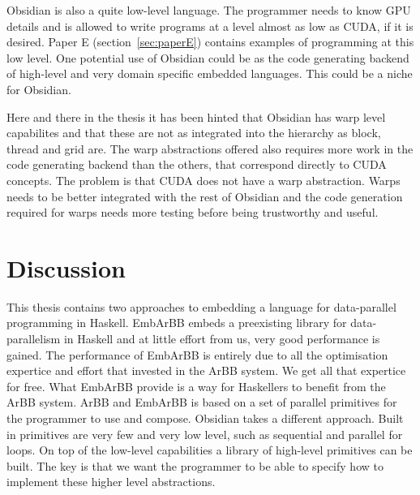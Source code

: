 \documentclass[a4paper]{book}
\begin{document}
Obsidian is also a quite low-level language. The programmer needs to know GPU details 
and is allowed to write programs at a level almost as low as CUDA, if it is desired. 
Paper E (section~\ref{sec:paperE}) contains examples of programming at this low level. 
One potential use of Obsidian could be as the code generating backend of high-level 
and very domain specific embedded languages. This could be a niche for Obsidian.  

Here and there in the thesis it has been hinted that Obsidian has warp level 
capabilites and that these are not as integrated into the hierarchy as block, 
thread and grid are. The warp abstractions offered also requires more work in 
the code generating backend than the others, that correspond directly to CUDA concepts. 
The problem is that CUDA does not have a warp abstraction. Warps needs to be 
better integrated with the rest of Obsidian and the code generation required 
for warps needs more testing before being trustworthy and useful. 



%
%

\section{Discussion} 

This thesis contains two approaches to embedding a language for data-parallel programming 
in Haskell. EmbArBB embeds a preexisting library for data-parallelism in Haskell 
and at little effort from us, very good performance is gained. The performance of 
EmbArBB is entirely due to all the optimisation expertice and effort that invested in 
the ArBB system. We get all that expertice for free. What EmbArBB provide is a 
way for Haskellers to benefit from the ArBB system. ArBB and EmbArBB is based on a 
set of parallel primitives for the programmer to use and compose. Obsidian takes 
a different approach. Built in primitives are very few and very low level, such as 
sequential and parallel for loops. On top of the low-level capabilities a library 
of high-level primitives can be built. The key is that we want the programmer to 
be able to specify how to implement these higher level abstractions. 
\end{document}

